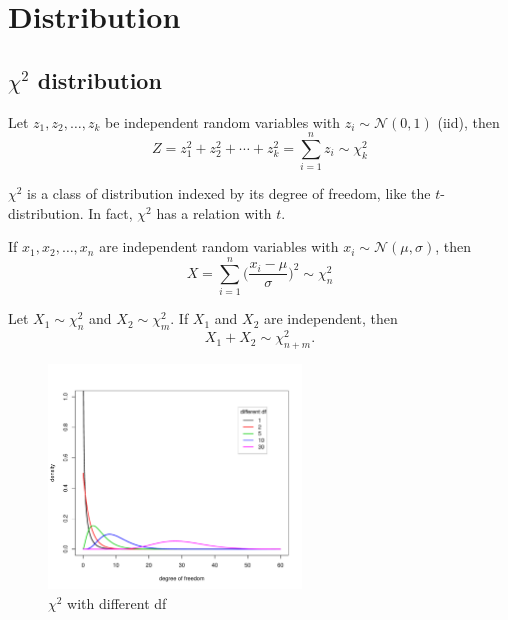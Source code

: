 \documentclass{book}
\begin{document}
\chapter{Distribution}
\section{$\chi^{2}$ distribution}

Let $z_{1},z_{2},\ldots,z_{k}$ be independent random variables with $z_{i}\sim \mathcal{N}(0,1)$ (iid), then
\begin{equation}
Z=z_{1}^{2}+z_{2}^{2}+\cdots+z_{k}^{2}=\sum_{i=1}^{n} z_{i} \sim \chi^{2}_{k}
\end{equation}

 $\chi^{2}$ is a class of distribution indexed by its degree of freedom, like the $t$-distribution. In fact, $\chi^{2}$ has a relation with $t$.

If $x_1 ,x_2,\ldots,x_n$ are independent random variables with $x_{i}\sim \mathcal{N}(\mu,\sigma)$, then
\begin{equation}
X =\sum_{i=1}^{n}\bigg(\frac{x_{i}-\mu}{\sigma}\bigg)^{2}\sim \chi^{2}_{n}
\end{equation}

Let $X_{1} \sim \chi^{2}_{n}$ and $X_{2} \sim \chi^{2}_{m}$. If $X_{1}$ and $X_{2}$ are independent, then
\begin{equation}
X_{1}+X_{2} \sim \chi^{2}_{n+m}.
\end{equation}

\begin{figure}[!htbp]
\centering
\includegraphics[width=0.6\textwidth]{./graph/chisq.pdf}
\caption{$\chi^{2}$ with different df}\label{fig:/graph/chisq.pdf}
\end{figure}
\end{document}

